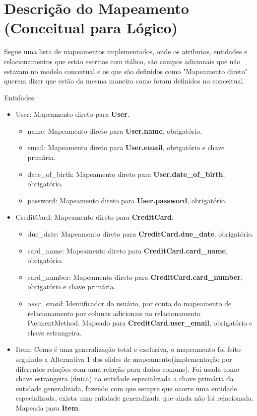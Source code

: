 \documentclass[a4paper, 11pt]{article}
\begin{document}
\newpage
\section*{Descrição do Mapeamento (Conceitual para Lógico)}

Segue uma lista de mapeamentos implementados, onde os atributos, entidades e relacionamentos que estão escritos com  itálico, são campos adicionais que não estavam no modelo conceitual e os que são definidos como "Mapeamento direto" querem dizer que estão da mesma maneira como foram definidos no conceitual.

Entidades:
\begin{itemize}
    \item User: Mapeamento direto para {\textbf{User}}.
    \begin{itemize}
        \item name: Mapeamento direto para {\textbf{User.name}}, obrigatório.
        \item email: Mapeamento direto para {\textbf{User.email}}, obrigatório e chave primária.
        \item date\_of\_birth: Mapeamento direto para {\textbf{User.date\_of\_birth}}, obrigatório.
        \item password: Mapeamento direto para {\textbf{User.password}}, obrigatório.
    \end{itemize}
    \item CreditCard: Mapeamento direto para {\textbf{CreditCard}}.
    \begin{itemize}
        \item due\_date: Mapeamento direto para {\textbf{CreditCard.due\_date}}, obrigatório.
        \item card\_name: Mapeamento direto para {\textbf{CreditCard.card\_name}}, obrigatório.
        \item card\_number: Mapeamento direto para {\textbf{CreditCard.card\_number}}, obrigatório e chave primária.
        \item{\textit{user\_email}}: Identificador do usuário, por conta do mapeamento de relacionamento por colunas adicionais no relacionamento PaymentMethod. Mapeado para {\textbf{CreditCard.user\_email}}, obrigatório e chave estrangeira.
    \end{itemize}
    \item Item: Como é uma generalização total e exclusiva, o mapeamento foi feito seguindo a Alternativa 1 dos slides de mapeamento(implementação por diferentes relações com uma relação para dados comuns). Foi usada como chave estrangeira (única) na entidade especializada a chave primária da entidade generalizada, fazendo com que sempre que ocorre uma entidade especializada, exista uma entidade generalizada que ainda não foi relacionada. Mapeada para {\textbf{Item}}.

\end{itemize}
\end{document}
